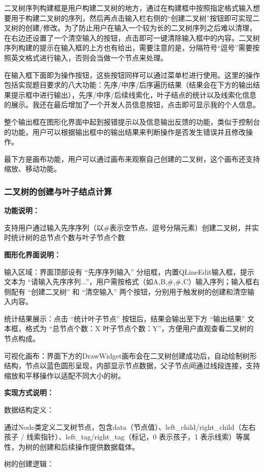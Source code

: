 \documentclass[12pt,a4paper]{article}
\begin{document}
二叉树序列构建框是用户构建二叉树的地方，通过在构建框中按照指定格式输入想要用于构建二叉树的序列，然后再点击输入栏右侧的“创建二叉树”按钮即可实现二叉树的创建/修改。为了防止用户在输入一个较为长的二叉树序列之后难以清理，在右边还设置了一个清空输入的按钮，点击即可一键清除输入框中的内容。二叉树序列构建的提示在输入框的上方也有给出，需要注意的是，分隔符号“逗号”需要按照英文格式进行输入，否则会当做一个节点来处理。

在输入框下面即为操作按钮，这些按钮同样可以通过菜单栏进行使用。这里的操作包括实现题目要求的八大功能：先序/中序/后序遍历结果（结果会在下方的输出结果提示框中进行输出），先序/中序/后续线索化，叶子结点的统计以及线索化信息的展示。我还在最后增加了一个开发人员信息按钮，点击即可显示我的个人信息。

整个输出框在图形化界面中起到报错提示以及信息输出反馈的功能，类似于控制台的功能，用户可以根据输出框中的输出结果来判断操作是否发生错误并且修改操作。

最下方是画布功能，用户可以通过画布来观察自己创建的二叉树，这个画布还支持缩放、移动功能。
\subsubsection{二叉树的创建与叶子结点计算}
\noindent\textbf{功能说明：}

支持用户通过输入先序序列（以\#表示空节点、逗号分隔元素）创建二叉树，并实时统计树的总节点个数与叶子节点个数

\noindent\textbf{图形化界面说明：}

输入区域：界面顶部设有 “先序序列输入” 分组框，内置QLineEdit输入框，提示文本为 “请输入先序序列...”，用户需按格式（如A,B,\#,\#,C）输入序列；输入框右侧配有 “创建二叉树” 和 “清空输入” 两个按钮，分别用于触发树的创建和清空输入内容。

统计结果展示：点击 “统计叶子节点” 按钮后，结果会输出至下方 “输出结果” 文本框，格式为 “总节点个数：X 叶子节点个数：Y”，方便用户直观查看二叉树的节点构成。

可视化画布：界面下方的DrawWidget画布会在二叉树创建成功后，自动绘制树形结构，节点以蓝色圆形呈现，内部显示节点数据，父子节点间通过线段连接，支持缩放和平移操作以适配不同大小的树。

\noindent\textbf{实现方式说明：}

数据结构定义：

通过Node类定义二叉树节点，包含data（节点值）、left\_child/right\_child（左右孩子 / 线索指针）、left\_tag/right\_tag（标记，0 表示孩子，1 表示线索）等属性，为树的创建和后续操作提供数据载体。

树的创建逻辑：
\end{document}
